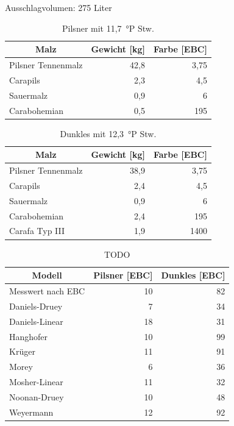 \documentclass[a4paper,parskip=half]{scrartcl}
\begin{document}
Ausschlagvolumen: 275 Liter


\begin{table}[H]
\centering
\begin{tabular}{lrr}
\toprule
\multicolumn{1}{c}{\textbf{Malz}} & \multicolumn{1}{c}{\textbf{Gewicht [kg]}} & \multicolumn{1}{c}{\textbf{Farbe [EBC]}} \\
\midrule
Pilsner Tennenmalz & 42,8 & 3,75 \\
Carapils & 2,3 & 4,5 \\
Sauermalz & 0,9 & 6 \\
Carabohemian & 0,5 & 195 \\
\bottomrule
\end{tabular}
\caption{Pilsner mit 11,7~°P Stw. \parencite{KrausWeyermann2021c}}
\label{table:pilsner}
\end{table}

\begin{table}[H]
\centering
\begin{tabular}{lrr}
\toprule
\multicolumn{1}{c}{\textbf{Malz}} & \multicolumn{1}{c}{\textbf{Gewicht [kg]}} & \multicolumn{1}{c}{\textbf{Farbe [EBC]}} \\
\midrule
Pilsner Tennenmalz & 38,9 & 3,75 \\
Carapils & 2,4 & 4,5 \\
Sauermalz & 0,9 & 6 \\
Carabohemian & 2,4 & 195 \\
Carafa Typ III & 1,9 & 1400 \\
\bottomrule
\end{tabular}
\caption{Dunkles mit 12,3~°P Stw. \parencite{KrausWeyermann2021c}}
\label{table:pilsner}
\end{table}

\begin{table}[H]
\centering
\begin{tabular}{lrr}
\toprule
\multicolumn{1}{c}{\textbf{Modell}} & \multicolumn{1}{c}{\textbf{Pilsner [EBC]}} & \multicolumn{1}{c}{\textbf{Dunkles [EBC]}} \\
\midrule
Messwert nach EBC & 10 & 82 \\
Daniels-Druey & 7 & 34 \\
Daniels-Linear & 18 & 31 \\
Hanghofer & 10 & 99 \\
Krüger & 11 & 91 \\
Morey & 6 & 36 \\
Mosher-Linear & 11 & 32 \\
Noonan-Druey & 10 & 48 \\
Weyermann & 12 & 92 \\
\bottomrule
\end{tabular}
\caption{TODO \textcite{KrausWeyermann2021c}}
\label{table:modelcompare}
\end{table}
\end{document}
